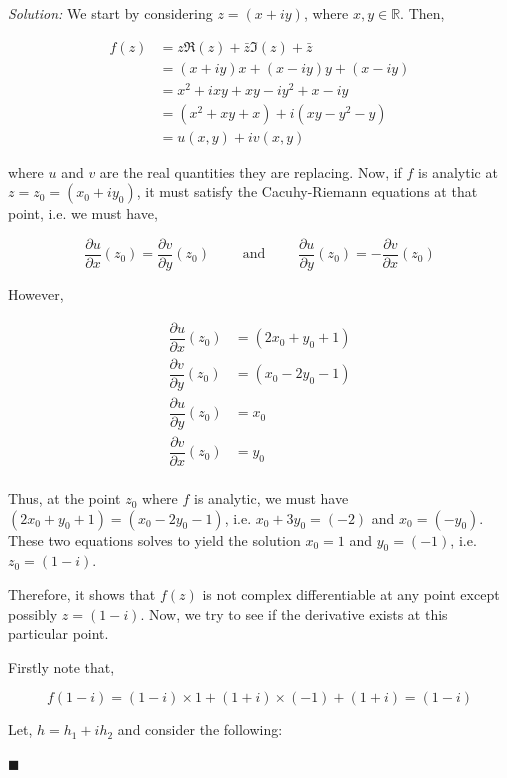 \documentclass[12pt]{article}
\newcommand{\R}{\mathbb{R}}
\theoremstyle{definition}
\newenvironment{answer}{\textit{Solution: }\quad }{ \hfill $\blacksquare$}
\numberwithin{equation}{section}
\begin{document}
\begin{answer}
	We start by considering $z = (x + iy)$, where $x, y\in \R$. Then,
	
	\begin{align*}
		f(z)
		& = z \Re(z) + \bar{z} \Im(z) + \bar{z}\\
		& = (x + iy) x + (x - iy)y + (x - iy)\\
		& = x^2 + ixy + xy - iy^2 + x - iy\\
		& = (x^2 + xy + x) + i(xy - y^2 - y)\\
		& = u(x, y) + i v(x, y)
	\end{align*}

	where $u$ and $v$ are the real quantities they are replacing. Now, if $f$ is analytic at $z = z_0 = (x_0 + i y_0)$, it must satisfy the Cacuhy-Riemann equations at that point, i.e. we must have,

	$$
	\dfrac{\partial u}{\partial x}(z_0) = \dfrac{\partial v}{\partial y}(z_0) \qquad \text{ and } \qquad \dfrac{\partial u}{\partial y}(z_0) = -\dfrac{\partial v}{\partial x}(z_0)
	$$

	However,

	\begin{align*}
		\dfrac{\partial u}{\partial x}(z_0) & = (2x_0 + y_0 + 1) \\
		\dfrac{\partial v}{\partial y}(z_0) & = (x_0 - 2y_0 - 1)\\
		\dfrac{\partial u}{\partial y}(z_0) & = x_0 \\
		\dfrac{\partial v}{\partial x}(z_0) & = y_0\\
	\end{align*}

	Thus, at the point $z_0$ where $f$ is analytic, we must have $(2x_0 + y_0 + 1) = (x_0 - 2y_0 - 1)$, i.e. $x_0 + 3y_0 = (-2)$ and $x_0 = (-y_0)$. These two equations solves to yield the solution $x_0 = 1$ and $y_0 = (-1)$, i.e. $z_0 = (1 - i)$.

	Therefore, it shows that $f(z)$ is not complex differentiable at any point except possibly $z = (1 - i)$. Now, we try to see if the derivative exists at this particular point.

	Firstly note that, 

	$$
	f(1-i) = (1-i)\times 1 + (1+i)\times (-1) + (1+i) = (1-i)
	$$

	Let, $h = h_1 + i h_2$ and consider the following:


\end{answer}
\end{document}
